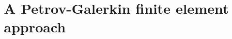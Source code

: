 \documentclass[11pt]{amsart}
\begin{document}
\section{A Petrov-Galerkin finite element approach}







\begin{comment}
Here is what the MPAS Land-Ice User's Manual version 3.0 says:

\begin{quote}
\small
Velocities and fluxes are calculated on the midpoint of Voronoi cell edges.  The normal component of surface slope is calculated on cell edges using surface elevation at adjacent cell centers.  The tangential component of surface slope is calculated on cell edges using surface elevation at adjacent vertices. The surface elevation at vertices is calculated from the values at adjacent cell centers using barycentric interpolation. Ice thickness on edges is calculated as the average of the adjacent cell center values (2nd-order approximation).
\end{quote}

Looking at this, and the code, I don't think they think of it as Petrov-Galerkin
\end{comment}
\end{document}

